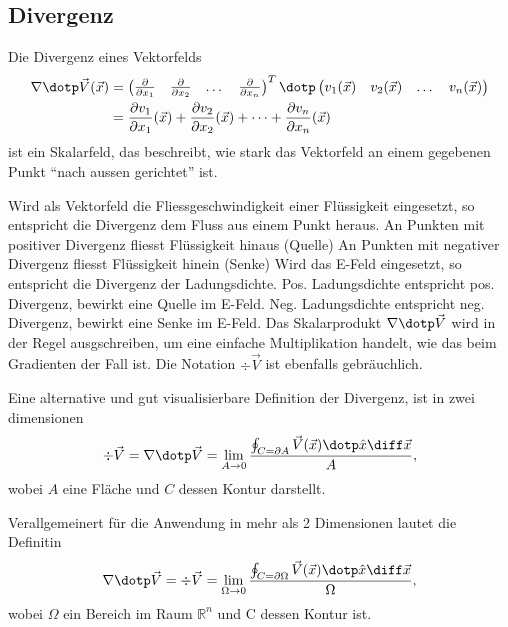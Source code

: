 \subsection{Divergenz}
Die Divergenz eines Vektorfelds
\[
\begin{aligned}
    \nabla \dotp \vec{V}(\vec{x})
    &= \begin{pmatrix} \frac{\partial}{\partial x_1} & \frac{\partial}{\partial x_2} & \dots & \frac{\partial}{\partial x_n} \end{pmatrix}^T \dotp \begin{pmatrix} v_1(\vec{x}) & v_2(\vec{x}) & \dots & v_n(\vec{x}) \end{pmatrix} \\
    &= \frac{\partial v_1}{\partial x_1}(\vec{x}) + \frac{\partial v_2}{\partial x_2}(\vec{x}) + \dots + \frac{\partial v_n}{\partial x_n}(\vec{x})
\end{aligned}
\]
ist ein Skalarfeld, das beschreibt, wie stark das Vektorfeld an einem gegebenen Punkt ``nach aussen gerichtet'' ist. 

\medskip
\begin{outline}
    \1 Wird als Vektorfeld die Fliessgeschwindigkeit einer Flüssigkeit eingesetzt, so entspricht die Divergenz dem Fluss aus einem Punkt heraus.
        \2 An Punkten mit positiver Divergenz fliesst Flüssigkeit hinaus (Quelle)
        \2 An Punkten mit negativer Divergenz fliesst Flüssigkeit hinein (Senke)
    \1 Wird das E-Feld eingesetzt, so entspricht die Divergenz der Ladungsdichte.
        \2 Pos. Ladungsdichte entspricht pos. Divergenz, bewirkt eine Quelle im E-Feld.
        \2 Neg. Ladungsdichte entspricht neg. Divergenz, bewirkt eine Senke im E-Feld.
    \1 Das Skalarprodukt $\nabla \dotp \vec{V}$ wird in der Regel ausgschreiben, um eine einfache Multiplikation handelt, wie das beim Gradienten der Fall ist.
    \1 Die Notation $ \div \vec{V}$ ist ebenfalls gebräuchlich.
\end{outline}

\medskip
Eine alternative und gut visualisierbare Definition der Divergenz, ist in zwei dimensionen
\[
    \div \vec{V} = \nabla\dotp\vec{V}  = \lim_{A \to 0}\frac{\oint_{C = \partial A} \vec{V}(\vec{x}) \dotp \hat{x} \diff \vec{x}}{A},
\]
wobei $A$ eine Fläche und $C$ dessen Kontur darstellt.

Verallgemeinert für die Anwendung in mehr als 2 Dimensionen lautet die Definitin
\[
    \nabla\dotp\vec{V} = \div \vec{V} = \lim_{\Omega \to 0}\frac{\oint_{C = \partial \Omega}\vec{V}(\vec{x}) \dotp \hat{x} \diff \vec{x}}{\Omega},
\]
wobei $\Omega$ ein Bereich im Raum $\mathbb{R}^n$ und C dessen Kontur ist.


